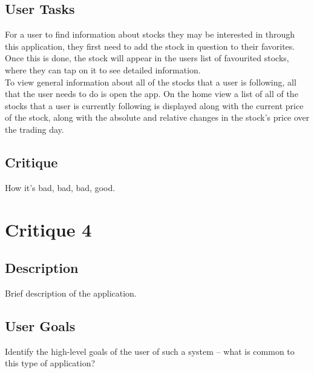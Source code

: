 \documentclass{sigchi}
\begin{document}

\subsection{User Tasks}
For a user to find information about stocks they may be interested in through this application, they first need to add the stock in question to their favorites.  Once this is done, the stock will appear in the users list of favourited stocks, where they can tap on it to see detailed information.\\
To view general information about all of the stocks that a user is following, all that the user needs to do is open the app.  On the home view a list of all of the stocks that a user is currently following is displayed along with the current price of the stock, along with the absolute and relative changes in the stock's price over the trading day.

\subsection{Critique}
How it's bad, bad, bad, good.



\section{Critique 4}
\subsection{Description}
Brief description of the application.

\subsection{User Goals}
Identify the high-level goals of the user of such a system – what is common to this type of
application?
\end{document}
